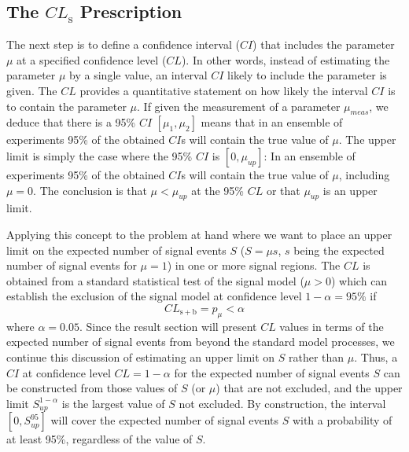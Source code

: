 \subsection{The $CL_\mathrm{s}$ Prescription}
The next step is to define a confidence interval ($CI$) that includes the parameter $\mu$ at a specified confidence level ($CL$). 
In other words, instead of estimating the parameter $\mu$ by a single value, an interval $CI$ likely to include the parameter is given.
The $CL$ provides a quantitative statement on how likely the interval $CI$ is to contain the parameter $\mu$. 
If given the measurement of a parameter $\mu_{meas}$, we deduce that there is a 95\% $CI$ $[\mu_1,\mu_2]$ means 
that in an ensemble of experiments 95\% of the obtained $CI$s will contain the true value of $\mu$.
The upper limit is simply the case where the 95\% $CI$ is $[0,\mu_{up}]$:
In an ensemble of experiments 95\% of the obtained $CI$s will contain the true value of $\mu$, including $\mu=0$. 
The conclusion is that $\mu < \mu_{up}$ at the 95\% $CL$ or that $ \mu_{up}$ is an upper limit. 

Applying this concept to the problem at hand where we want to place an upper limit on the expected number of 
signal events $S$ ($S=\mu s$, $s$ being the expected number of signal events for $\mu=1$) in one or more signal regions.
The $CL$ is obtained from a standard statistical test of the signal model ($\mu>0$) which can establish the exclusion of the signal 
model at confidence level $1-\alpha = 95 \%$ if 
\begin{equation}
  CL_\mathrm{s+b}  = p_{\mu} < \alpha
\end{equation}
where $\alpha=0.05$. 
Since the result section will present $CL$ values in terms of the expected number of signal events from beyond the standard model 
processes, we continue this discussion of estimating an upper limit on $S$ rather than $\mu$.
Thus, a $CI$ at confidence level $CL=1-\alpha$ for the expected number of signal events $S$ can be constructed from those values of
$S$ (or $\mu$) that are not excluded, and the upper limit $S_{up}^{1-\alpha}$ is the largest value of $S$ not excluded.
By construction, the interval $[0,S_{up}^{95}]$ will cover the expected number of signal events $S$ with a probability of at least 
95\%, regardless of the value of $S$.

